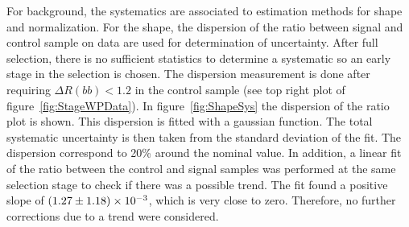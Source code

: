 \begin{table*}[htbH]
\begin{center}
\end{center}
\caption{Summary of uncertainties for signal yields. In addition, all mass points have 2.6\% uncertainty from luminosity measurement.\label{tab:sys}}
\end{table*}

For background, the systematics are associated to estimation methods for shape and normalization. For the shape, the dispersion of the ratio between signal and control sample on data are used for determination of uncertainty. After full selection, there is no sufficient statistics to determine a systematic so an early stage in the selection is chosen. The dispersion measurement is done after requiring $\Delta R(bb) <1.2$ in the control sample (see top right plot of figure~\ref{fig:StageWPData}). In figure~\ref{fig:ShapeSys} the dispersion of the ratio plot is shown. This dispersion is fitted with a gaussian function. The total systematic uncertainty is then taken from the standard deviation of the fit. The dispersion correspond to 20\% around the nominal value. In addition, a linear fit of the ratio between the control and signal samples was performed at the same selection stage to check if there was a possible trend. The fit found a positive slope of $(1.27\pm1.18)\times 10^{-3}$, which is very close to zero. Therefore, no further corrections due to a trend were considered. 

